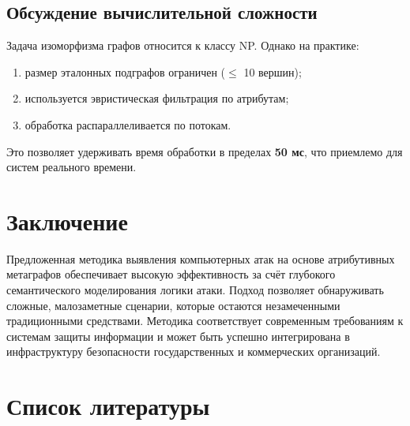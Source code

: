 \documentclass[12pt,a4paper]{extarticle}
\begin{document}
\subsection{Обсуждение вычислительной сложности}

Задача изоморфизма графов относится к классу NP. Однако на практике:
\begin{enumerate}
    \item размер эталонных подграфов ограничен ($\leq$ 10 вершин);
    \item используется эвристическая фильтрация по атрибутам;
    \item обработка распараллеливается по потокам.
\end{enumerate}
Это позволяет удерживать время обработки в пределах \textbf{50 мс}, что приемлемо для систем реального времени.

\section{Заключение}

Предложенная методика выявления компьютерных атак на основе атрибутивных метаграфов обеспечивает высокую эффективность за счёт глубокого семантического моделирования логики атаки. Подход позволяет обнаруживать сложные, малозаметные сценарии, которые остаются незамеченными традиционными средствами. Методика соответствует современным требованиям к системам защиты информации и может быть успешно интегрирована в инфраструктуру безопасности государственных и коммерческих организаций.

\section*{Список литературы}
\end{document}
